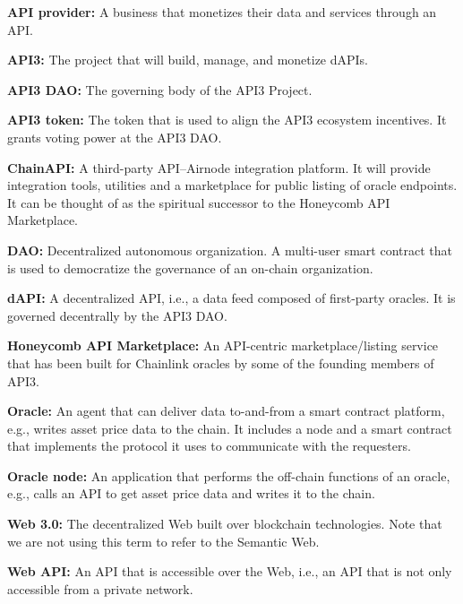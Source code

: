\documentclass[11pt]{article}
\begin{document}
\textbf{API provider:} A business that monetizes their data and services through an API.

\textbf{API3:} The project that will build, manage, and monetize dAPIs.

\textbf{API3 DAO:} The governing body of the API3 Project.

\textbf{API3 token:} The token that is used to align the API3 ecosystem incentives.
It grants voting power at the API3 DAO.

\textbf{ChainAPI:} A third-party API--Airnode integration platform.
It will provide integration tools, utilities and a marketplace for public listing of oracle endpoints.
It can be thought of as the spiritual successor to the Honeycomb API Marketplace.

\textbf{DAO:} Decentralized autonomous organization.
A multi-user smart contract that is used to democratize the governance of an on-chain organization.

\textbf{dAPI:} A decentralized API, i.e., a data feed composed of first-party oracles.
It is governed decentrally by the API3 DAO.

\textbf{Honeycomb API Marketplace:} An API-centric marketplace/listing service that has been built for Chainlink oracles by some of the founding members of API3.

\textbf{Oracle:} An agent that can deliver data to-and-from a smart contract platform, e.g., writes asset price data to the chain.
It includes a node and a smart contract that implements the protocol it uses to communicate with the requesters.

\textbf{Oracle node:} An application that performs the off-chain functions of an oracle, e.g., calls an API to get asset price data and writes it to the chain.

\textbf{Web 3.0:} The decentralized Web built over blockchain technologies.
Note that we are not using this term to refer to the Semantic Web.

\textbf{Web API:} An API that is accessible over the Web, i.e., an API that is not only accessible from a private network.
\end{document}
